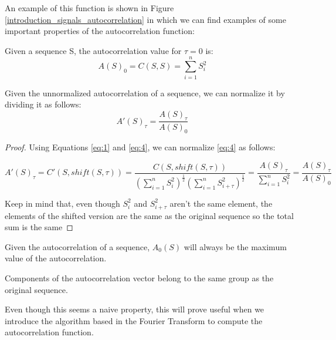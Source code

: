 An example of this function is shown in Figure
\ref{introduction_signals_autocorrelation} in which we can find examples of
some important properties of the autocorrelation function:

\begin{theorem}\label{theorem:1.2.1}
  Given a sequence S, the autocorrelation value for $\tau = 0$ is:
    \begin{equation}
      A(S)_{0}=C(S, S)=\sum_{i=1}^{n}S_{i}^2
    \end{equation}
\end{theorem}

\begin{corollary}
  Given the unnormalized autocorrelation of a sequence, we can
  normalize it by dividing it as follows:
  \begin{equation}
    A'(S)_{\tau} = \frac{A(S)_{\tau}}{A(S)_{0}}
  \end{equation}
\end{corollary}

\begin{proof}
  Using Equations \ref{eq:1} and \ref{eq:4}, we can normalize \ref{eq:4} as
  follows:

    $$A'(S)_{\tau} = C'(S, shift(S, \tau)) = \frac{C(S, shift(S, \tau))}{(\sum_{i=1}^{n} S_{i}^{2})^{\frac{1}{2}}(\sum_{i=1}^{n} S_{i+\tau}^{2})^\frac{1}{2}} = \frac{A(S)_{\tau}}{\sum_{i=1}^{n} S_{i}^{2}} = \frac{A(S)_{\tau}}{A(S)_{0}}$$

  Keep in mind that, even though $S_{i}^2$ and $S_{i+\tau}^2$ aren't the same element, the elements of the shifted version are the same as the original sequence so the total sum is the same
\end{proof}

\begin{corollary}\label{autocorrelation:coro:1}
  Given the autocorrelation of a sequence, $A_{0}(S)$ will always be the maximum value of the autocorrelation.
\end{corollary}

\begin{property}
 Components of the autocorrelation vector belong to the same group as the
  original sequence.
\end{property}

Even though this seems a naive property, this will prove
useful when we introduce the algorithm based in the Fourier Transform to
compute the autocorrelation function.









